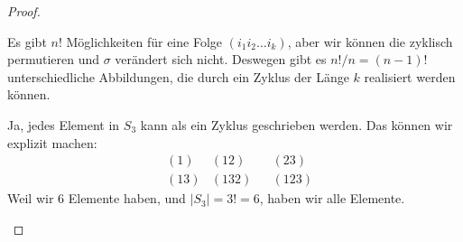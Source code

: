 \begin{proof}
	\begin{parts}
	\item Es gibt $n!$ Möglichkeiten f\"{u}r eine Folge $(i_1i_2\dots i_k)$, aber wir können die zyklisch permutieren und $\sigma$ verändert sich nicht. Deswegen gibt es $n! / n = (n-1)!$ unterschiedliche Abbildungen, die durch ein Zyklus der Länge $k$ realisiert werden können.

		Ja, jedes Element in $S_3$ kann als ein Zyklus geschrieben werden. Das können wir explizit machen:
		\begin{align*}
			& (1) & (12) & & (23)\\
			& (13) & (132) & & (123)
		\end{align*}
		Weil wir $6$ Elemente haben, und $|S_3|=3! = 6$, haben wir alle Elemente.


\end{parts}
\end{proof}
